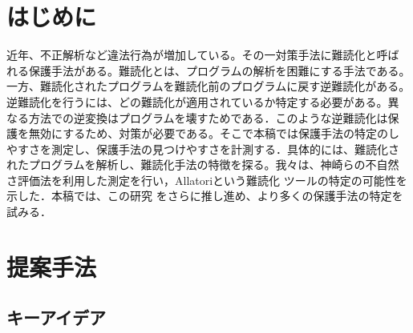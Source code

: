 \documentclass[a4j,fleqn,10pt]{jarticle}
\begin{document}

\maketitle


\section{はじめに}

近年、不正解析など違法行為が増加している。その一対策手法に難読化と呼ば
れる保護手法がある。難読化とは、プログラムの解析を困難にする手法である。
一方、難読化されたプログラムを難読化前のプログラムに戻す逆難読化がある。
逆難読化を行うには、どの難読化が適用されているか特定する必要がある。異
なる方法での逆変換はプログラムを壊すためである．このような逆難読化は保
護を無効にするため、対策が必要である。そこで本稿では保護手法の特定のし
やすさを測定し、保護手法の見つけやすさを計測する．具体的には、難読化さ
れたプログラムを解析し、難読化手法の特徴を探る。我々は、神崎らの不自然
さ評価法\cite{kanzaki14ipsj}を利用した測定を行い，Allatoriという難読化
ツールの特定の可能性を示した\cite{sagisaka15sigss}．本稿では、この研究
をさらに推し進め、より多くの保護手法の特定を試みる．

\section{提案手法}\label{sect:proposedmethod}

\subsection{キーアイデア}\label{sect:keyidea}
\end{document}
